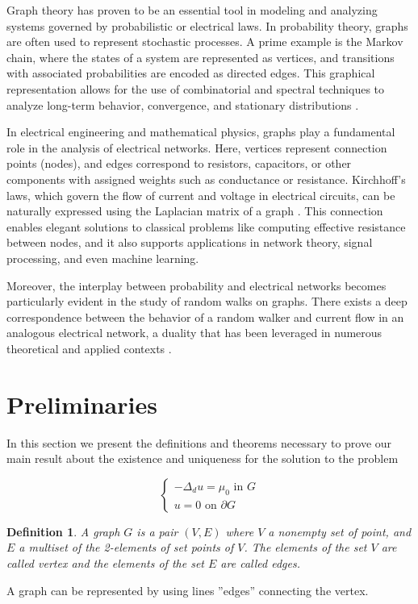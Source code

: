 \documentclass{article}
\newtheorem{definition}{Definition}
\begin{document}
Graph theory has proven to be an essential tool in modeling and analyzing systems governed by probabilistic or electrical laws. In probability theory, graphs are often used to represent stochastic processes. A prime example is the Markov chain, where the states of a system are represented as vertices, and transitions with associated probabilities are encoded as directed edges. This graphical representation allows for the use of combinatorial and spectral techniques to analyze long-term behavior, convergence, and stationary distributions \cite{KemenySnell, Norris}.

In electrical engineering and mathematical physics, graphs play a fundamental role in the analysis of electrical networks. Here, vertices represent connection points (nodes), and edges correspond to resistors, capacitors, or other components with assigned weights such as conductance or resistance. Kirchhoff’s laws, which govern the flow of current and voltage in electrical circuits, can be naturally expressed using the Laplacian matrix of a graph \cite{DoyleSnell, Bollobas}. This connection enables elegant solutions to classical problems like computing effective resistance between nodes, and it also supports applications in network theory, signal processing, and even machine learning.

Moreover, the interplay between probability and electrical networks becomes particularly evident in the study of random walks on graphs. There exists a deep correspondence between the behavior of a random walker and current flow in an analogous electrical network, a duality that has been leveraged in numerous theoretical and applied contexts \cite{DoyleSnell}.



\section{Preliminaries}
In this section we present the definitions and theorems necessary to prove our main result about the existence and uniqueness for the solution to the problem

\begin{equation}
    \begin{cases}
           -\Delta_d u=\mu_0 \text{ in } G \\
           u=0 \text{ on } \partial G
      \end{cases}\label{principal_problem}
\end{equation}

\begin{definition}
   A graph $G$ is a pair $(V,E)$ where $V$ a  nonempty set of point, and $E$ a multiset of the 2-elements of set points of $V$. The elements of the set $V$ are  called vertex and the elements of the set $E$ are called edges. 
\end{definition}
A graph can be represented by using lines ''edges'' connecting the vertex.
\\
\end{document}
